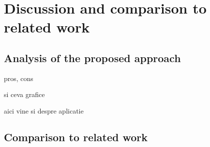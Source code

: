 \section{Discussion and comparison to related work}
\subsection{Analysis of the proposed approach}
pros, cons

si ceva grafice 

aici vine si despre aplicatie
\subsection{Comparison to related work}

